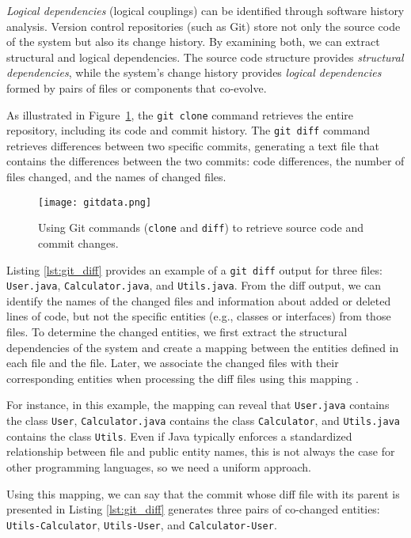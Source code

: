 \hspace{4em}\textit{Logical dependencies} (logical couplings) can be identified through software history analysis. Version control repositories (such as Git) store not only the source code of the system but also its change history. By examining both, we can extract structural and logical dependencies. The source code structure provides \textit{structural dependencies}, while the system’s change history provides \textit{logical dependencies} formed by pairs of files or components that co-evolve.

As illustrated in Figure~\ref{fig:extracting_data_with_git}, the \texttt{git clone} command retrieves the entire repository, including its code and commit history. The \texttt{git diff} command retrieves differences between two specific commits, generating a text file that contains the differences between the two commits: code differences, the number of files changed, and the names of changed files.

\begin{figure}[H]
\centering
\texttt{[image: gitdata.png]}
\caption{Using Git commands (\texttt{clone} and \texttt{diff}) to retrieve source code and commit changes.}
\label{fig:extracting_data_with_git}
\end{figure}


Listing \ref{lst:git_diff} provides an example of a \texttt{git diff} output for three files: \texttt{User.java}, \texttt{Calculator.java}, and \texttt{Utils.java}. From the diff output, we can identify the names of the changed files and information about added or deleted lines of code, but not the specific entities (e.g., classes or interfaces) from those files. To determine the changed entities, we first extract the structural dependencies of the system and create a mapping between the entities defined in each file and the file. Later, we associate the changed files with their corresponding entities when processing the diff files using this mapping \cite{DepSACI, b4, icstcc-2024, enase19}. 

For instance, in this example, the mapping can reveal that \texttt{User.java} contains the class \texttt{User}, \texttt{Calculator.java} contains the class \texttt{Calculator}, and \texttt{Utils.java} contains the class \texttt{Utils}. Even if Java typically enforces a standardized relationship between file and public entity names, this is not always the case for other programming languages, so we need a uniform approach.

Using this mapping, we can say that the commit whose diff file with its parent is presented in Listing \ref{lst:git_diff} generates three pairs of co-changed entities: \texttt{Utils-Calculator}, \texttt{Utils-User}, and \texttt{Calculator-User}.

